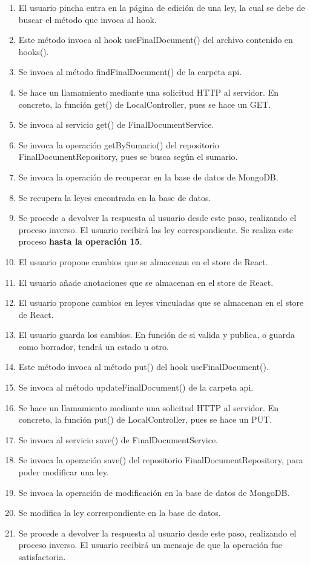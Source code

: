 \begin{enumerate}
    \item El usuario pincha entra en la página de edición de una ley, la cual se debe de buscar el método que invoca al hook.
    \item Este método invoca al hook useFinalDocument() del archivo contenido en hooks().
    \item Se invoca al método findFinalDocument() de la carpeta api.
    \item Se hace un llamamiento mediante una solicitud HTTP al servidor. En concreto, la función get() de LocalController, pues se hace un GET.
    \item Se invoca al servicio get() de FinalDocumentService.
    \item Se invoca la operación getBySumario() del repositorio FinalDocumentRepository, pues se busca según el sumario.
    \item Se invoca la operación de recuperar en la base de datos de MongoDB.
    \item Se recupera la leyes encontrada en la base de datos.
    \item Se procede a devolver la respuesta al usuario desde este paso, realizando el proceso inverso. El usuario recibirá las ley correspondiente. Se realiza este proceso {\bf hasta la operación 15}.
    \item El usuario propone cambios que se almacenan en el store de React.
    \item El usuario añade anotaciones que se almacenan en el store de React.
    \item El usuario propone cambios en leyes vinculadas que se almacenan en el store de React.
    \item El usuario guarda los cambios. En función de si valida y publica, o guarda como borrador, tendrá un estado u otro.
    \item Este método invoca al método put() del hook useFinalDocument().
    \item Se invoca al método updateFinalDocument() de la carpeta api.
    \item Se hace un llamamiento mediante una solicitud HTTP al servidor. En concreto, la función put() de LocalController, pues se hace un PUT.
    \item Se invoca al servicio save() de FinalDocumentService.
    \item Se invoca la operación save() del repositorio FinalDocumentRepository, para poder modificar una ley.
    \item Se invoca la operación de modificación en la base de datos de MongoDB.
    \item Se modifica la ley correspondiente en la base de datos.
    \item Se procede a devolver la respuesta al usuario desde este paso, realizando el proceso inverso. El usuario recibirá un mensaje de que la operación fue satisfactoria.
\end{enumerate}